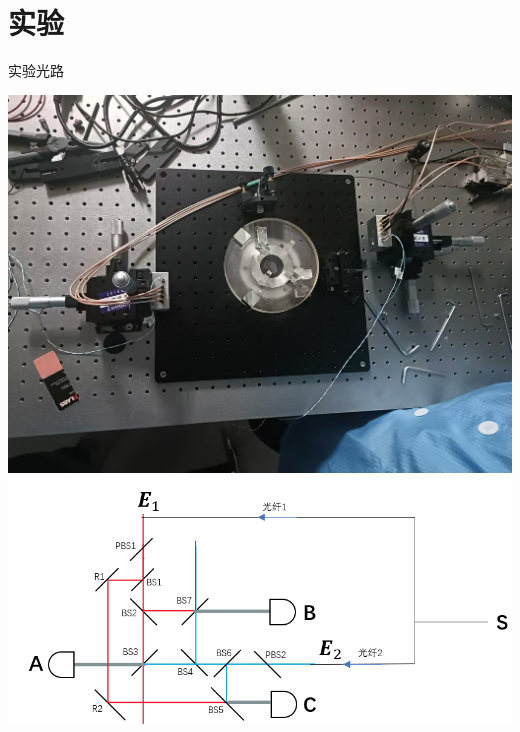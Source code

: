 \documentclass{beamer}
\begin{document}
\section{实验}
\begin{frame}{实验光路}
    \begin{minipage}[t]{\textwidth}
        \includegraphics[width=\linewidth, height=0.45\textheight, keepaspectratio]{image/1.jpg}
        \vspace{0.5em} %
        \includegraphics[width=\linewidth, height=0.45\textheight, keepaspectratio]{image/2.png}
    \end{minipage}
\end{frame}
\end{document}
